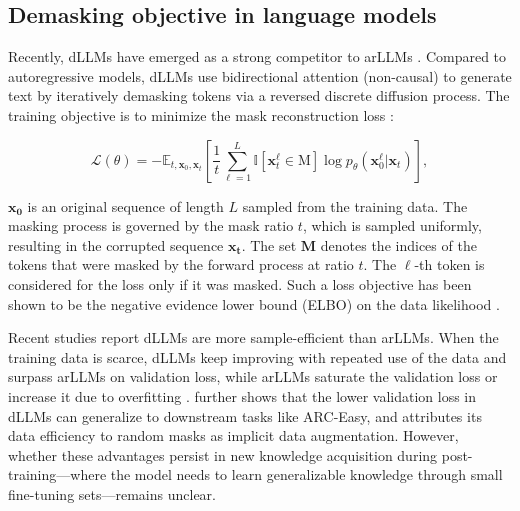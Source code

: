 \subsection{Demasking objective in language models}


Recently, dLLMs have emerged as a strong competitor to arLLMs \citep{sahoo2024simple, llada, ye2025dream}. Compared to autoregressive models, dLLMs use bidirectional attention (non-causal) to generate text by iteratively demasking tokens via a reversed discrete diffusion process. The training objective is to minimize the mask reconstruction loss \cite{llada}:

\begin{equation}
\mathcal{L}(\theta) = -\mathbb{E}_{t,\boldsymbol{x}_0,\boldsymbol{x}_t}\left[\frac{1}{t}\sum_{\ell=1}^{L}\mathbb{I}[\boldsymbol{x}_t^{\ell} \in \text{M}]\log p_\theta(\boldsymbol{x}_0^{\ell}|\boldsymbol{x}_t)\right],
\label{eq:1}
\end{equation}

$\boldsymbol{x_0}$ is an original sequence of length $L$ sampled from the training data. The masking process is governed by the mask ratio $t$, which is sampled uniformly, resulting in the corrupted sequence $\boldsymbol{x_t}$. The set $\mathbf{M}$ denotes the indices of the tokens that were masked by the forward process at ratio $t$. The $\ell$-th token is considered for the loss only if it was masked. Such a loss objective has been shown to be the negative evidence lower bound (ELBO) on the data likelihood \citep{shi2024simplified}.

Recent studies report dLLMs are more sample-efficient than arLLMs. When the training data is scarce, dLLMs keep improving with repeated use of the data and surpass arLLMs on validation loss, while arLLMs saturate the validation loss or increase it due to overfitting \citep{prabhudesai2025diffusion, ni2025difflm}. \citet{prabhudesai2025diffusion} further shows that the lower validation loss in dLLMs can generalize to downstream tasks like ARC-Easy, and attributes its data efficiency to random masks as implicit data augmentation. However, whether these advantages persist in new knowledge acquisition during post-training—where the model needs to learn generalizable knowledge through small fine-tuning sets—remains unclear. 


